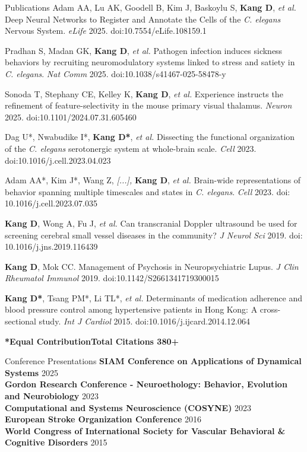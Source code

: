 \documentclass{resume} %
\begin{document}
\begin{rSection}{Publications}
Adam AA, Lu AK, Goodell B, Kim J, Baskoylu S, \textbf{Kang D}, \textit{et al.} Deep Neural Networks to Register and Annotate the Cells of the \textit{C. elegans} Nervous System. \textit{eLife} 2025. doi:10.7554/eLife.108159.1

Pradhan S, Madan GK, \textbf{Kang D}, \textit{et al.} Pathogen infection induces sickness behaviors by recruiting neuromodulatory systems linked to stress and satiety in \textit{C. elegans}. \textit{Nat Comm} 2025. doi:10.1038/s41467-025-58478-y

Sonoda T, Stephany CE, Kelley K, \textbf{Kang D}, \textit{et al.} Experience instructs the refinement of feature-selectivity in the mouse primary visual thalamus. \textit{Neuron} 2025. doi:10.1101/2024.07.31.605460

Dag U*, Nwabudike I*, \textbf{Kang D*}, \textit{et al.} Dissecting the functional organization of the \textit{C. elegans} serotonergic system at whole-brain scale. \textit{Cell} 2023. doi:10.1016/j.cell.2023.04.023

Adam AA*, Kim J*, Wang Z, \textit{[...],} \textbf{Kang D}, \textit{et al.} Brain-wide representations of behavior spanning multiple timescales and states in \textit{C. elegans}. \textit{Cell} 2023. doi: 10.1016/j.cell.2023.07.035

\textbf{Kang D}, Wong A, Fu J, \textit{et al.} Can transcranial Doppler ultrasound be used for screening cerebral small vessel diseases in the community? \textit{J Neurol Sci
} 2019. doi: 10.1016/j.jns.2019.116439

\textbf{Kang D}, Mok CC. Management of Psychosis in Neuropsychiatric Lupus. \textit{J Clin Rheumatol Immunol
} 2019. doi:10.1142/S2661341719300015

\textbf{Kang D*}, Tsang PM*, Li TL*, \textit{et al.} Determinants of medication adherence and blood pressure control among hypertensive patients in Hong Kong: A cross-sectional study. \textit{Int J Cardiol} 2015. doi:10.1016/j.ijcard.2014.12.064

\textbf{*Equal Contribution}\hfill \textbf{Total Citations 380+}
\end{rSection}

\begin{rSection}{Conference Presentations}
\textbf{SIAM Conference on Applications of Dynamical Systems} \hfill 2025 \\
\textbf{Gordon Research Conference - Neuroethology: Behavior, Evolution and Neurobiology} \hfill 2023 \\
\textbf{Computational and Systems Neuroscience (COSYNE)} \hfill 2023 \\
\textbf{European Stroke Organization Conference} \hfill 2016 \\
\textbf{World Congress of International Society for Vascular Behavioral \& Cognitive Disorders} \hfill 2015 \\
\end{rSection}
\vspace{-1em}
\end{document}
